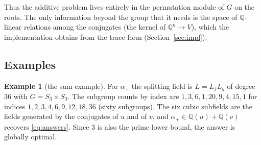 \documentclass[11pt,a4paper]{article}
\theoremstyle{definition}
\newtheorem{example}[theorem]{Example}
\theoremstyle{remark}
\newcommand{\Q}{\mathbb{Q}}
\begin{document}
Thus the additive problem lives entirely in the permutation module of $G$ on the roots.  The only
information beyond the group that it needs is the space of $\Q$-linear relations among the conjugates
(the kernel of $\Q^n\to V$), which the implementation obtains from the trace form
(Section~\ref{sec:impl}).

\subsection{Examples}

\begin{example}[the sum example]
For $\alpha_+$ the splitting field is $L=L_fL_g$ of degree $36$ with $G=S_3\times S_3$.  The subgroup
counts by index are $1,3,6,1,20,9,4,15,1$ for indices $1,2,3,4,6,9,12,18,36$ (sixty subgroups).  The
six cubic subfields are the fields generated by the conjugates of $u$ and of $v$, and
$\alpha_+\in\Q(u)+\Q(v)$ recovers \eqref{eq:answers}.  Since $3$ is also the prime lower bound, the
answer is globally optimal.
\end{example}
\end{document}
